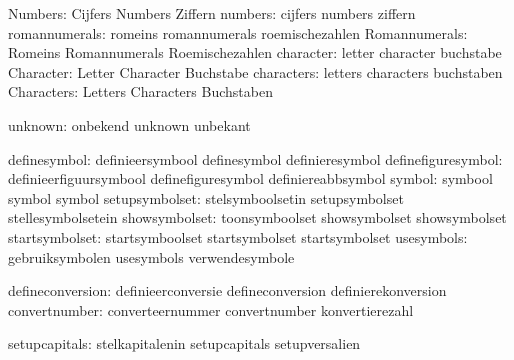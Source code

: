                       Numbers:  Cijfers                      Numbers
                                Ziffern
                      numbers:  cijfers                      numbers
                                ziffern
                romannumerals:  romeins                      romannumerals
                                roemischezahlen
                Romannumerals:  Romeins                      Romannumerals
                                Roemischezahlen
                    character:  letter                       character
                                buchstabe
                    Character:  Letter                       Character
                                Buchstabe
                   characters:  letters                      characters
                                buchstaben
                   Characters:  Letters                      Characters
                                Buchstaben

                      unknown:  onbekend                     unknown
                                unbekant

                 definesymbol:  definieersymbool             definesymbol
                                definieresymbol
           definefiguresymbol:  definieerfiguursymbool       definefiguresymbol
                                definiereabbsymbol
                       symbol:  symbool                      symbol
                                symbol
               setupsymbolset:  stelsymboolsetin             setupsymbolset
                                stellesymbolsetein
                showsymbolset:  toonsymboolset               showsymbolset
                                showsymbolset
               startsymbolset:  startsymboolset              startsymbolset
                                startsymbolset
                   usesymbols:  gebruiksymbolen              usesymbols
                                verwendesymbole

             defineconversion:  definieerconversie           defineconversion
                                definierekonversion
                convertnumber:  converteernummer             convertnumber
                                konvertierezahl

                setupcapitals:  stelkapitalenin              setupcapitals 
                                setupversalien %

